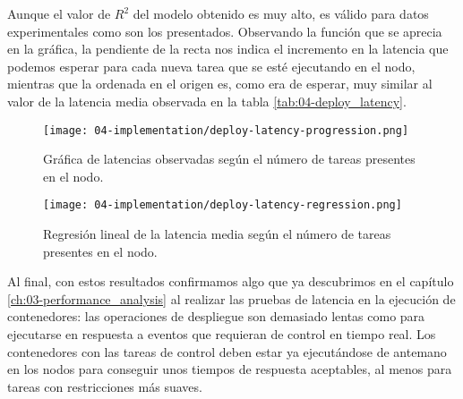 Aunque el valor de $R^{2}$ del modelo obtenido es muy alto, es válido para datos
experimentales como son los presentados. Observando la función que se aprecia en
la gráfica, la pendiente de la recta nos indica el incremento en la latencia que
podemos esperar para cada nueva tarea que se esté ejecutando en el nodo,
mientras que la ordenada en el origen es, como era de esperar, muy similar al
valor de la latencia media observada en la tabla \ref{tab:04-deploy_latency}.

\begin{figure}
    \centering
    \texttt{[image: 04-implementation/deploy-latency-progression.png]}
    \caption{Gráfica de latencias observadas según el número de tareas presentes
        en el nodo.}
    \label{fig:04-deploy_latency_progression}
\end{figure}

\begin{figure}[H]
    \centering
    \texttt{[image: 04-implementation/deploy-latency-regression.png]}
    \caption{Regresión lineal de la latencia media según el número de tareas
        presentes en el nodo.}
    \label{fig:04-deploy_latency_regression}
\end{figure}

Al final, con estos resultados confirmamos algo que ya descubrimos en el
capítulo \ref{ch:03-performance_analysis} al realizar las pruebas de latencia en
la ejecución de contenedores: las operaciones de despliegue son demasiado lentas
como para ejecutarse en respuesta a eventos que requieran de control en tiempo
real. Los contenedores con las tareas de control deben estar ya ejecutándose de
antemano en los nodos para conseguir unos tiempos de respuesta aceptables, al
menos para tareas con restricciones más suaves.